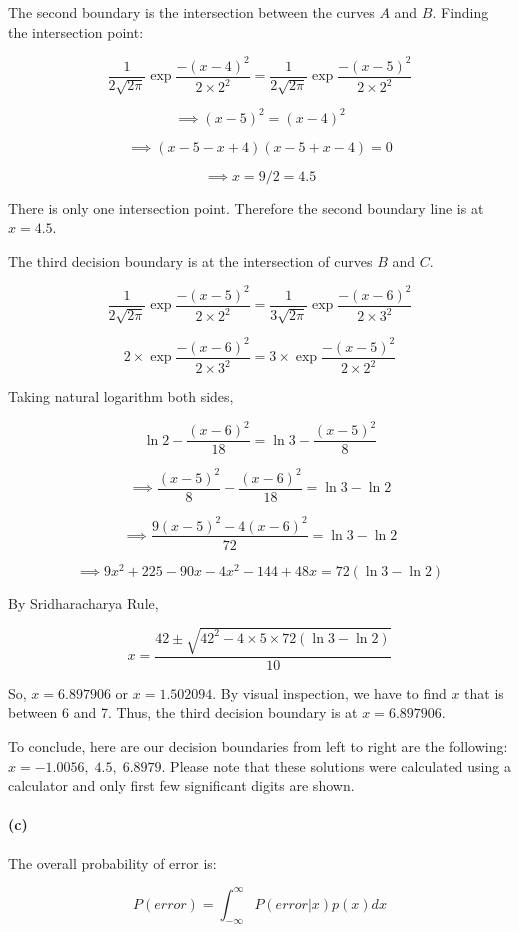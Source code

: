\documentclass{article}
\begin{document}
The second boundary is the intersection between the curves $A$ and $B$. Finding the intersection point:

$$
\frac{1}{2\sqrt{2\pi}} \exp{\frac{-(x - 4)^2}{2\times 2^2}} = 
\frac{1}{2\sqrt{2\pi}} \exp{\frac{-(x - 5)^2}{2\times 2^2}}
$$

$$
\implies (x-5)^2 = (x-4)^2
$$

$$
\implies (x-5-x+4)(x-5+x-4) = 0
$$

$$
\implies x = 9/2 = 4.5
$$

There is only one intersection point. Therefore the second boundary line is at $x = 4.5$. 

The third decision boundary is at the intersection of curves $B$ and $C$.

$$
\frac{1}{2\sqrt{2\pi}} \exp{\frac{-(x - 5)^2}{2\times 2^2}} = 
\frac{1}{3\sqrt{2\pi}} \exp{\frac{-(x - 6)^2}{2\times 3^2}}
$$

$$
2 \times \exp{\frac{-(x - 6)^2}{2\times 3^2}} = 
3 \times \exp{\frac{-(x - 5)^2}{2\times 2^2}}
$$

Taking natural logarithm both sides, 

$$
\ln{2} - \frac{(x - 6)^2}{18} = 
\ln{3} - \frac{(x - 5)^2}{8}
$$

$$
\implies \frac{(x - 5)^2}{8} - \frac{(x - 6)^2}{18} = \ln{3} - \ln{2}
$$

$$
\implies \frac{9(x-5)^2 - 4(x-6)^2}{72} = \ln{3} - \ln{2}
$$

$$
\implies
9x^2+225-90x-4x^2-144+48x=72(\ln{3} -\ln{2})
$$

By Sridharacharya Rule,

$$
x = \frac{42\pm\sqrt{42^2 - 4\times5\times72(\ln{3}-\ln{2})}}{10}
$$

So, $x = 6.897906$ or $x = 1.502094$. By visual inspection, we have to find $x$ that is between 6 and 7. Thus, the third decision boundary is at $x=6.897906$.

To conclude, here are our decision boundaries from left to right are the following: $x =  -1.0056,\; 4.5, \;6.8979$. Please note that these solutions were calculated using a calculator and only first few significant digits are shown.

\paragraph{(c)}

The overall probability of error is:

$$
P(error) =
\int_{-\infty}^\infty P(error|x)p(x) dx
$$
\end{document}
